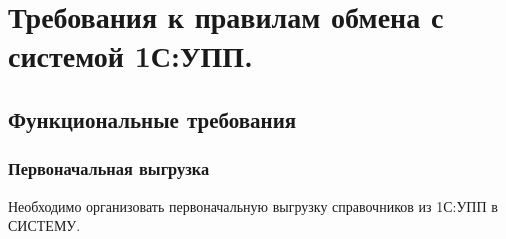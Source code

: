 \newpage

\section{Требования к правилам обмена с системой 1С:УПП.}
\label{sec:exchange}

%
%
%
%






\subsection{Функциональные требования}

\subsubsection{Первоначальная выгрузка}


Необходимо организовать первоначальную выгрузку справочников из 1С:УПП в СИСТЕМУ.



